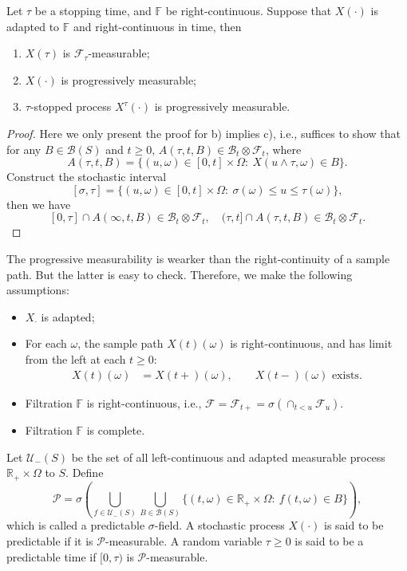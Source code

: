 \begin{proposition}
Let $\tau$ be a stopping time, and $\mathbb{F}$ be right-continuous.
Suppose that $X(\cdot)$ is adapted to $\mathbb{F}$ and right-continuous in time, then
\begin{enumerate}
\item
$X(\tau)$ is $\mathcal{F}_{\tau}$-measurable;
\item
$X(\cdot)$ is progressively measurable;
\item
$\tau$-stopped process $X^{\tau}(\cdot)$ is progressively measurable.
\end{enumerate}
\end{proposition}
\begin{proof}
Here we only present the proof for b) implies c), i.e., suffices to show that for any $B\in\mathcal{B}(S)$ and $t\ge0$, $A(\tau,t,B)\in\mathcal{B}_t\otimes\mathcal{F}_t$, where
\[
A(\tau,t,B)=\{(u,\omega)\in[0,t]\times\Omega:~X(u\land\tau,\omega)\in B\}.
\]
Construct the stochastic interval
\[
[\sigma,\tau]=\{(u,\omega)\in[0,t]\times\Omega:~\sigma(\omega)\le u\le \tau(\omega)\},
\]
then we have
\[
[0,\tau]\cap A(\infty,t,B)\in \mathcal{B}_t\otimes\mathcal{F}_t,\quad
(\tau,t]\cap A(\tau, t, B)\in \mathcal{B}_t\otimes\mathcal{F}_t.
\]
\end{proof}


The progressive measurability is wearker than the right-continuity of a sample path.
But the  latter is easy to check. Therefore, we make the following assumptions:
\begin{itemize}
\item
$X_{\cdot}$ is adapted;
\item
For each $\omega$, the sample path $X(t)(\omega)$ is right-continuous, and has limit from the left at each $t\ge0$:
\begin{align*}
X(t)(\omega)&=X(t+)(\omega),\qquad
X(t-)(\omega)\text{ exists}.
\end{align*}
\item
Filtration $\mathbb{F}$ is right-continuous, i.e., $\mathcal{F}=\mathcal{F}_{t+}=\sigma(\cap_{t<u}\mathcal{F}_u)$.
\item
Filtration $\mathbb{F}$ is complete.
\end{itemize}

\begin{definition}[Predictable]
Let $\mathcal{U}_{-}(S)$ be the set of all left-continuous and adapted measurable process $\mathbb{R}_+\times\Omega$ to $S$.
Define
\[
\mathcal{P}=\sigma\left(
\bigcup_{f\in \mathcal{U}_{-}(S)}\bigcup_{B\in\mathcal{B}(S)}
\{(t,\omega)\in\mathbb{R}_+\times\Omega:~f(t,\omega)\in B\}
\right),
\]
which is called a predictable $\sigma$-field.
A stochastic process $X(\cdot)$ is said to be predictable if it is $\mathcal{P}$-measurable.
A random variable $\tau\ge0$ is said to be a predictable time if $[0,\tau)$ is $\mathcal{P}$-measurable.
\end{definition}

